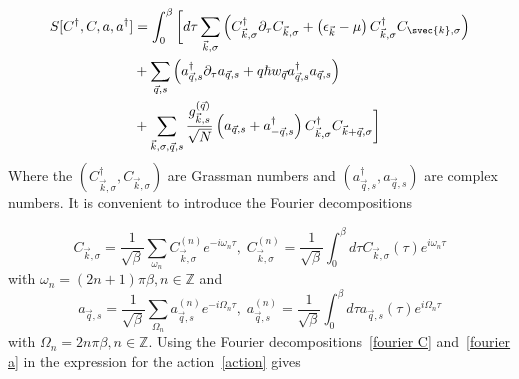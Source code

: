 \documentclass{article}
\begin{document}
\begin{align}
    S[C^{\dagger},C,a,a^{\dagger}] &= \int_0^{\beta}\bigg[d\tau \sum_{\vec{k},\sigma}\left( C_{\vec{k},\sigma}^{\dagger} \partial_{\tau} C_{\vec{k},\sigma} + \left(\epsilon_{\vec{k}} - \mu\right) C_{\vec{k},\sigma}^{\dagger} C_{\svec{k},\sigma}\right) \nonumber\\ 
                                  &+ \sum_{\vec{q},s}\left( a_{\vec{q},s}^{\dagger} \partial_{\tau} a_{\vec{q},s} +q \hbar w_{\vec{q}} a_{\vec{q},s}^{\dagger}a_{\vec{q},s}\right) \label{action} \\
                                  &+ \sum_{\vec{k},\sigma,\vec{q},s} \frac{g_{\vec{k},s}^{(\vec{q})}}{\sqrt{N}} \left(a_{\vec{q},s} + a_{-\vec{q}, s}^{\dagger}\right) C_{\vec{k},\sigma}^{\dagger} C_{\vec{k} + \vec{q},\sigma}\bigg]\nonumber
\end{align}
Where the $(C_{\vec{k},\sigma}^{\dagger}, C_{\vec{k},\sigma})$ are Grassman numbers and $(a_{\vec{q},s}^{\dagger},a_{\vec{q},s})$ are complex numbers. It is convenient to introduce the Fourier decompositions

\begin{equation}
C_{\vec{k},\sigma} = \frac{1}{\sqrt{\beta}}\sum_{\omega_n} C^{(n)}_{\vec{k},\sigma} e^{-i \omega_n \tau},\; C^{(n)}_{\vec{k},\sigma} = \frac{1}{\sqrt{\beta}} \int_0^{\beta} d\tau C_{\vec{k},\sigma}(\tau) e^{i \omega_n \tau}
\label{fourier C}
\end{equation}
with $\omega_n = (2n + 1)\pi\beta, n \in  \mathbb{Z}$ and
\begin{equation}
a_{\vec{q},s} = \frac{1}{\sqrt{\beta}}\sum_{\Omega_n} a^{(n)}_{\vec{q},s} e^{-i \Omega_n \tau},\; a^{(n)}_{\vec{q},s} = \frac{1}{\sqrt{\beta}} \int_0^{\beta} d\tau a_{\vec{q},s}(\tau) e^{i \Omega_n \tau}
\label{fourier a}
\end{equation}
with  $\Omega_n = 2n\pi\beta, n \in  \mathbb{Z}$. Using the Fourier decompositions~\cref{fourier C} and~\cref{fourier a} in the expression for the action~\cref{action} gives
\end{document}
